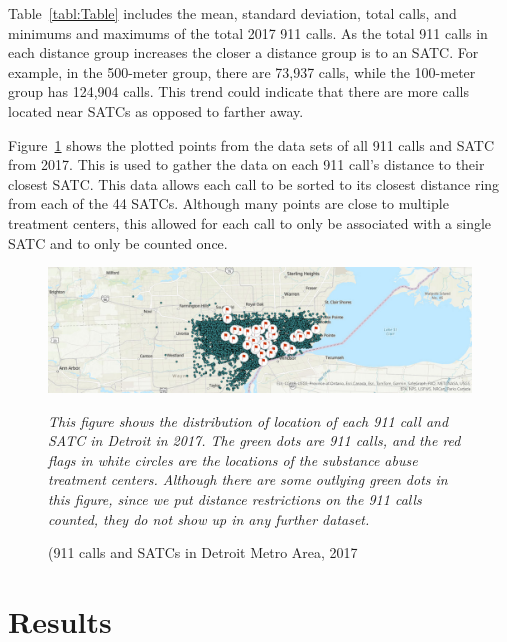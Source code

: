 \documentclass[12pt]{article}
\begin{document}
Table~\ref{tabl:Table} includes the mean, standard deviation, total calls, and minimums and maximums of the total 2017 911 calls. As the total 911 calls in each distance group increases the closer a distance group is to an SATC. For example, in the 500-meter group, there are 73,937 calls, while the 100-meter group has 124,904 calls. This trend could indicate that there are more calls located near SATCs as opposed to farther away. 

Figure~\ref{fig:Figure2} shows the plotted points from the data sets of all 911 calls and SATC from 2017. This is used to gather the data on each 911 call's distance to their closest SATC. This data allows each call to be sorted to its closest distance ring from each of the 44 SATCs. Although many points are close to multiple treatment centers, this allowed for each call to only be associated with a single SATC and to only be counted once.

\begin{figure}[h!]
    \centering
\includegraphics[width=0.75\linewidth]{Reproducibility Package/Visual Graphics/ArcGIS_Map.jpg}
    \caption{(911 calls and SATCs in Detroit Metro Area, 2017}
    \label{fig:Figure2}
     \textit{This figure shows the distribution of location of each 911 call and SATC in Detroit in 2017. The green dots are 911 calls, and the red flags in white circles are the locations of the substance abuse treatment centers. Although there are some outlying green dots in this figure, since we put distance restrictions on the 911 calls counted, they do not show up in any further dataset.}
    
\end{figure}




\section{Results}
\label{sec:result}
\end{document}
